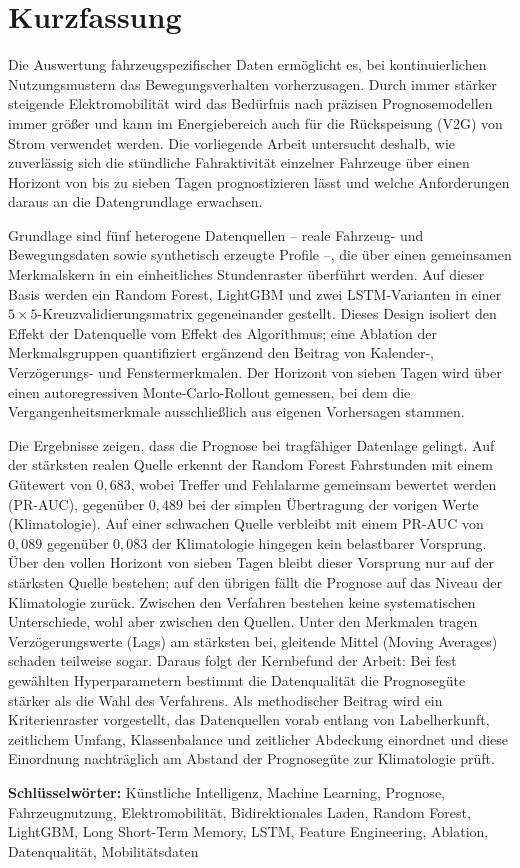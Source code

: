 \chapter*{Kurzfassung}

Die Auswertung fahrzeugspezifischer Daten ermöglicht es, bei kontinuierlichen Nutzungsmustern das Bewegungsverhalten vorherzusagen. Durch immer stärker steigende Elektromobilität wird das Bedürfnis nach präzisen Prognosemodellen immer größer und kann im Energiebereich auch für die Rückspeisung (V2G) von Strom verwendet werden. Die vorliegende Arbeit untersucht deshalb, wie zuverlässig sich die stündliche Fahraktivität einzelner Fahrzeuge über einen Horizont von bis zu sieben Tagen prognostizieren lässt und welche Anforderungen daraus an die Datengrundlage erwachsen.

Grundlage sind fünf heterogene Datenquellen -- reale Fahrzeug- und Bewegungsdaten sowie synthetisch erzeugte Profile --, die über einen gemeinsamen Merkmalskern in ein einheitliches Stundenraster überführt werden. Auf dieser Basis werden ein Random Forest, LightGBM und zwei LSTM-Varianten in einer $5\times5$-Kreuzvalidierungsmatrix gegeneinander gestellt. Dieses Design isoliert den Effekt der Datenquelle vom Effekt des Algorithmus; eine Ablation der Merkmalsgruppen quantifiziert ergänzend den Beitrag von Kalender-, Verzögerungs- und Fenstermerkmalen. Der Horizont von sieben Tagen wird über einen autoregressiven Monte-Carlo-Rollout gemessen, bei dem die Vergangenheitsmerkmale ausschließlich aus eigenen Vorhersagen stammen.

Die Ergebnisse zeigen, dass die Prognose bei tragfähiger Datenlage gelingt. Auf der stärksten realen Quelle erkennt der Random Forest Fahrstunden mit einem Gütewert von $0,683$, wobei Treffer und Fehlalarme gemeinsam bewertet werden (PR-AUC), gegenüber $0,489$ bei der simplen Übertragung der vorigen Werte (Klimatologie). Auf einer schwachen Quelle verbleibt mit einem PR-AUC von $0,089$ gegenüber $0,083$ der Klimatologie hingegen kein belastbarer Vorsprung. Über den vollen Horizont von sieben Tagen bleibt dieser Vorsprung nur auf der stärksten Quelle bestehen; auf den übrigen fällt die Prognose auf das Niveau der Klimatologie zurück. Zwischen den Verfahren bestehen keine systematischen Unterschiede, wohl aber zwischen den Quellen. Unter den Merkmalen tragen Verzögerungswerte (Lags) am stärksten bei, gleitende Mittel (Moving Averages) schaden teilweise sogar. Daraus folgt der Kernbefund der Arbeit: Bei fest gewählten Hyperparametern bestimmt die Datenqualität die Prognosegüte stärker als die Wahl des Verfahrens. Als methodischer Beitrag wird ein Kriterienraster vorgestellt, das Datenquellen vorab entlang von Labelherkunft, zeitlichem Umfang, Klassenbalance und zeitlicher Abdeckung einordnet und diese Einordnung nachträglich am Abstand der Prognosegüte zur Klimatologie prüft.

\vspace{1cm}

\textbf{Schlüsselwörter:} Künstliche Intelligenz, Machine Learning, Prognose, Fahrzeugnutzung, Elektromobilität, Bidirektionales Laden, Random Forest, LightGBM, Long Short-Term Memory, LSTM, Feature Engineering, Ablation, Datenqualität, Mobilitätsdaten
